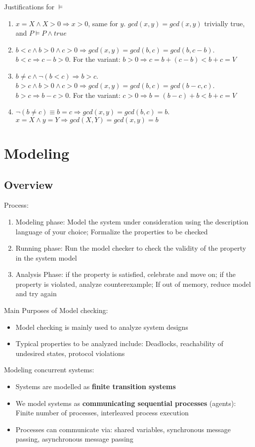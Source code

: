 \documentclass{article}
\begin{document}
\begin{enumerate}
          Justifications for $\vDash$
          \begin{enumerate}[label=(\arabic*)]
              \item $x=X \land X > 0 \Rightarrow x>0$, same for $y$. $gcd(x,y)=gcd(x,y)$ trivially true, and $P \vDash P \land true$
              \item $b < c \land b > 0 \land c >0 \Rightarrow gcd(x,y)=gcd(b,c)=gcd(b, c-b)$. $b<c \Rightarrow c-b>0$.
                    For the variant: $b>0 \Rightarrow c = b +(c-b) < b+c = V$
              \item $b \neq c \land \lnot(b<c) \Rightarrow b>c.$  $b > c  \land b > 0 \land c >0 \Rightarrow gcd(x,y)=gcd(b,c)=gcd(b-c, c)$. $b>c \Rightarrow b-c>0$.
                    For the variant: $c>0 \Rightarrow b = (b-c)+b < b+c = V$
              \item $\lnot(b \neq c) \equiv b = c \Rightarrow gcd(x,y)=gcd(b,c)=b$. $x=X \land y=Y \Rightarrow gcd(X,Y)=gcd(x,y)=b$
          \end{enumerate}
\end{enumerate}

\section{Modeling}

\subsection{Overview}
Process:
\begin{enumerate}
    \item Modeling phase: Model the system under consideration using the description language of your choice;
          Formalize the properties to be checked
    \item Running phase: Run the model checker to check the validity of the property in the system model
    \item Analysis Phase: if the property is satisfied, celebrate and move on; if the property is violated, analyze counterexample;
          If out of memory, reduce model and try again
\end{enumerate}
\smallskip
Main Purposes of Model checking:
\begin{itemize}
    \item Model checking is mainly used to analyze system designs
    \item Typical properties to be analyzed include: Deadlocks, reachability of undesired states, protocol violations
\end{itemize}
\smallskip
Modeling concurrent systems:
\begin{itemize}
    \item Systems are modelled as \textbf{finite transition systems}
    \item We model systems as \textbf{communicating sequential processes} (agents): Finite number of processes, interleaved process execution
    \item Processes can communicate via: shared variables, synchronous message passing, asynchronous message passing
\end{itemize}
\end{document}
